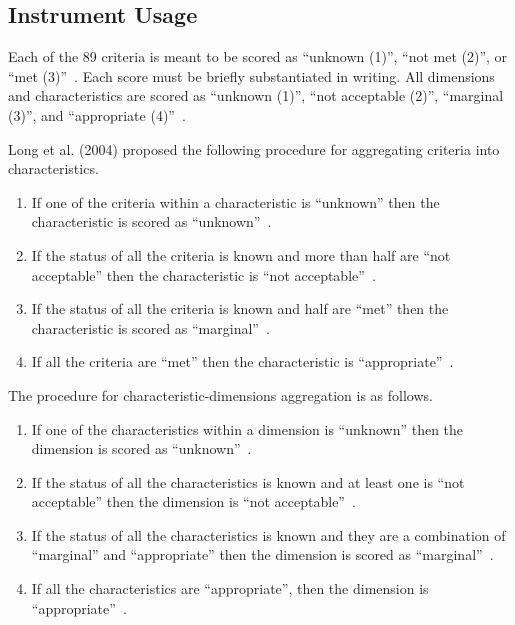 \subsection{Instrument Usage}

Each of the 89 criteria is meant to be scored as \enquote{unknown (1)}, \enquote{not met (2)}, or \enquote{met (3)}~\cite{long2004}.
Each score must be briefly substantiated in writing.
All dimensions and characteristics are scored as \enquote{unknown (1)}, \enquote{not acceptable (2)}, \enquote{marginal (3)}, and \enquote{appropriate (4)}~\cite{long2004}.

Long et al. (2004) proposed the following procedure for aggregating criteria into characteristics.
\begin{enumerate}
    \item If one of the criteria within a characteristic is \enquote{unknown} then the characteristic is scored as \enquote{unknown}~\cite{long2004}.
    \item If the status of all the criteria is known and more than half are \enquote{not acceptable} then the characteristic is \enquote{not acceptable}~\cite{long2004}.
    \item If the status of all the criteria is known and half are \enquote{met} then the characteristic is scored as \enquote{marginal}~\cite{long2004}.
    \item If all the criteria are \enquote{met} then the characteristic is \enquote{appropriate}~\cite{long2004}.
\end{enumerate}

\noindent The procedure for characteristic-dimensions aggregation is as follows.
\begin{enumerate}
    \item If one of the characteristics within a dimension is \enquote{unknown} then the dimension is scored as \enquote{unknown}~\cite{long2004}.
    \item If the status of all the characteristics is known and at least one is \enquote{not acceptable} then the dimension is \enquote{not acceptable}~\cite{long2004}.
    \item If the status of all the characteristics is known and they are a combination of \enquote{marginal} and \enquote{appropriate} then the dimension is scored as \enquote{marginal}~\cite{long2004}.
    \item If all the characteristics are \enquote{appropriate}, then the dimension is \enquote{appropriate}~\cite{long2004}.
\end{enumerate}

